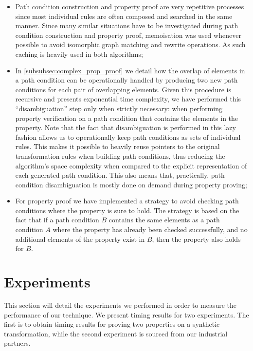 \begin{itemize}
\item Path condition construction and property proof are very repetitive
processes since most individual rules are often composed and searched in 
the same manner. Since many similar situations have to be investigated during
path condition construction and property proof, memoisation was used whenever
possible to avoid isomorphic graph matching and rewrite operations.
As such caching is heavily used in both algorithms;

\item In \cref{subsubsec:complex_prop_proof} we detail how the overlap of elements in a path condition can be operationally handled by producing two new path conditions for each pair of overlapping elements. Given this procedure is recursive and presents exponential
time complexity, we have performed this ``disambiguation'' step only when strictly necessary:  when performing
property verification on a path condition that contains the elements in
the property.
Note that the fact that  disambiguation is performed in this lazy fashion
allows us to operationally keep path conditions as sets of individual rules.
This makes it possible to heavily reuse pointers to the original transformation
rules when building path conditions, thus reducing the algorithm's space complexity when compared to the explicit representation of
each generated path condition. This also means that, practically,
path condition disambiguation is mostly done on demand during property proving;

\item For property proof we have implemented a strategy to avoid checking path
conditions where the property is sure to hold. The strategy is based on the fact
that if a path condition $B$ contains the same elements as a path condition
$A$ where the property has already been checked successfully, and no additional
elements of the property exist in $B$, then the property also holds
for $B$.
\end{itemize}



\section{Experiments}
\label{sec:experiments}

This section will detail the experiments we performed in order to measure the performance of our technique. We present timing results for two experiments. The first is to obtain timing results for proving two properties on a synthetic transformation, while the second experiment is sourced from our industrial partners.

